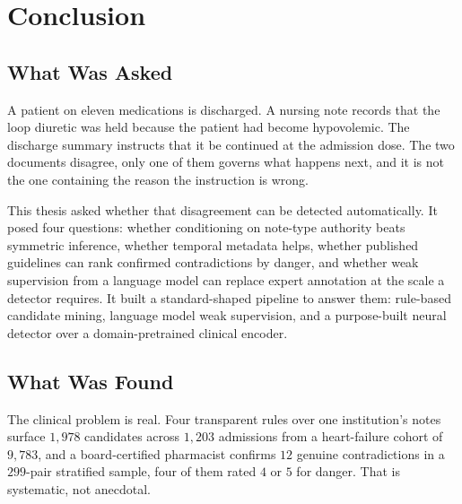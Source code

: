 %
%

\chapter{Conclusion}
\label{ch:conclusion}

\section{What Was Asked}
\label{sec:conc-asked}

A patient on eleven medications is discharged. A nursing note records that the
loop diuretic was held because the patient had become hypovolemic. The discharge
summary instructs that it be continued at the admission dose. The two documents
disagree, only one of them governs what happens next, and it is not the one
containing the reason the instruction is wrong.

This thesis asked whether that disagreement can be detected automatically. It
posed four questions: whether conditioning on note-type authority beats
symmetric inference, whether temporal metadata helps, whether published
guidelines can rank confirmed contradictions by danger, and whether weak
supervision from a language model can replace expert annotation at the scale a
detector requires. It built a standard-shaped pipeline to answer them:
rule-based candidate mining, language model weak supervision, and a
purpose-built neural detector over a domain-pretrained clinical encoder.

\section{What Was Found}
\label{sec:conc-found}

The clinical problem is real. Four transparent rules over one institution's notes
surface $1{,}978$ candidates across $1{,}203$ admissions from a heart-failure
cohort of $9{,}783$, and a board-certified pharmacist confirms $12$ genuine
contradictions in a $299$-pair stratified sample, four of them rated $4$ or $5$
for danger. That is systematic, not anecdotal.


